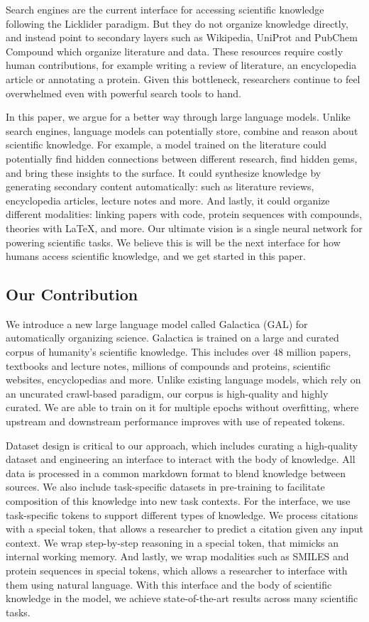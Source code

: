 Search engines are the current interface for accessing scientific knowledge following the Licklider paradigm. But they do not organize knowledge directly, and instead point to secondary layers such as Wikipedia, UniProt and PubChem Compound which organize literature and data. These resources require costly human contributions, for example writing a review of literature, an encyclopedia article or annotating a protein. Given this bottleneck, researchers continue to feel overwhelmed even with powerful search tools to hand.

In this paper, we argue for a better way through large language models. Unlike search engines, language models can potentially store, combine and reason about scientific knowledge. For example, a model trained on the literature could potentially find hidden connections between different research, find hidden gems, and bring these insights to the surface. It could synthesize knowledge by generating secondary content automatically: such as literature reviews, encyclopedia articles, lecture notes and more. And lastly, it could organize different modalities: linking papers with code, protein sequences with compounds, theories with LaTeX, and more. Our ultimate vision is a single neural network for powering scientific tasks. We believe this is will be the next interface for how humans access scientific knowledge, and we get started in this paper.

\subsection{Our Contribution}

We introduce a new large language model called Galactica (GAL) for automatically organizing science. Galactica is trained on a large and curated corpus of humanity's scientific knowledge. This includes over 48 million papers, textbooks and lecture notes, millions of compounds and proteins, scientific websites, encyclopedias and more. Unlike existing language models, which rely on an uncurated crawl-based paradigm, our corpus is high-quality and highly curated. We are able to train on it for multiple epochs without overfitting, where upstream and downstream performance improves with use of repeated tokens.

Dataset design is critical to our approach, which includes curating a high-quality dataset and engineering an interface to interact with the body of knowledge. All data is processed in a common markdown format to blend knowledge between sources. We also include task-specific datasets in pre-training to facilitate composition of this knowledge into new task contexts. For the interface, we use task-specific tokens to support different types of knowledge. We process citations with a special token, that allows a researcher to predict a citation given any input context. We wrap step-by-step reasoning in a special token, that mimicks an internal working memory. And lastly, we wrap modalities such as SMILES and protein sequences in special tokens, which allows a researcher to interface with them using natural language. With this interface and the body of scientific knowledge in the model, we achieve state-of-the-art results across many scientific tasks.

